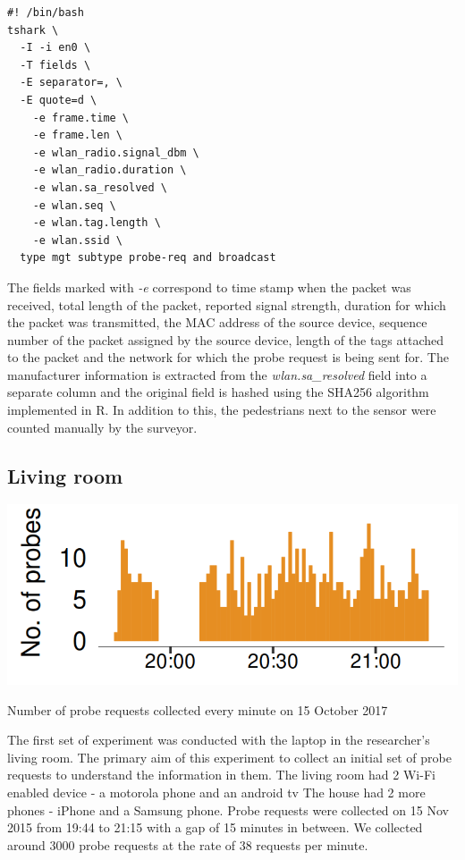 \begin{verbatim}
#! /bin/bash
tshark \
  -I -i en0 \
  -T fields \
  -E separator=, \
  -E quote=d \
    -e frame.time \
    -e frame.len \
    -e wlan_radio.signal_dbm \
    -e wlan_radio.duration \
    -e wlan.sa_resolved \
    -e wlan.seq \
    -e wlan.tag.length \
    -e wlan.ssid \
  type mgt subtype probe-req and broadcast
\end{verbatim}

The fields marked with \textit{-e} correspond to time stamp when the packet was received, total length of the packet, reported signal strength, duration for which the packet was transmitted, the MAC address of the source device, sequence number of the packet assigned by the source device, length of the tags attached to the packet and the network for which the probe request is being sent for.
The manufacturer information is extracted from the \textit{wlan.sa\_resolved} field into a separate column and the original field is hashed using the SHA256 algorithm implemented in R.
In addition to this, the pedestrians next to the sensor were counted manually by the surveyor.

\subsection{Living room}

\begin{marginfigure}
  \forcerectofloat
  \includegraphics{images/home-total-count.png}
  \caption{Number of probe requests collected every minute on 15 October 2017}
  \label{figure:collection:home:total}
\end{marginfigure}

The first set of experiment was conducted with the laptop in the researcher's living room.
The primary aim of this experiment to collect an initial set of probe requests to understand the information in them.
The living room had 2 Wi-Fi enabled device - a motorola phone and an android tv 
The house had 2 more phones - iPhone and a Samsung phone.
Probe requests were collected on 15 Nov 2015 from 19:44 to 21:15 with a gap of 15 minutes in between.
We collected around 3000 probe requests at the rate of 38 requests per minute.

